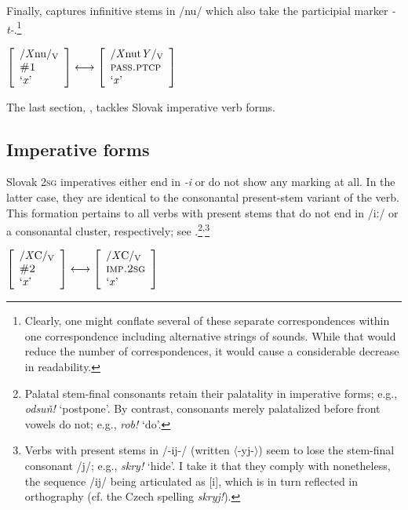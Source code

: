 \documentclass[output=paper,colorlinks,citecolor=brown]{langscibook}
\begin{document}
\noindent Finally,  captures infinitive stems in /nu/ which also take the participial mark\-er \textit{-t-}.\footnote{Clearly, one might conflate several of these separate correspondences within one correspondence including alternative strings of sounds. While that would reduce the number of correspondences, it would cause a considerable decrease in readability.}

\ea\label{ex:rulePASS_t_2}
$\left[
\begin{array}{l}
    \text{/\textit{X}nu/\textsubscript{V}} \\
    \textsc{\#1} \\
    \text{`\textit{x}'}
\end{array}
\right] 
\longleftrightarrow
\left[
\begin{array}{l}
    \text{/\textit{X}nut\textit{Y}/\textsubscript{V}} \\
    \textsc{pass.ptcp} \\
    \text{`\textit{x}'}
\end{array}
\right] $
\z

\noindent The last section, , tackles Slovak imperative verb forms.


\subsection{Imperative forms}\label{sec:IMP}

Slovak \textsc{2sg} imperatives either end in \textit{-i} or do not show any marking at all. In the latter case, they are identical to the consonantal present-stem variant of the verb. This formation pertains to all verbs with present stems that do not end in /iː/ or a consonantal cluster, respectively; see .\footnote{Palatal stem-final consonants retain their palatality in imperative forms; e.g., \textit{odsuň!} `postpone'. By contrast, consonants merely palatalized before front vowels do not; e.g., \textit{rob!} `do'.}\textsuperscript{,}\footnote{Verbs with present stems in /-ij-/ (written $\langle$-yj-$\rangle$) seem to lose the stem-final consonant /j/; e.g., \textit{skry!} `hide'. I take it that they comply with  nonetheless, the sequence /ij/ being articulated as [i], which is in turn reflected in orthography (cf. the Czech spelling \textit{skryj!}).}

\ea\label{ex:ruleIMP_1}
$\left[
\begin{array}{l}
    \text{/\textit{X}C/\textsubscript{V}} \\
    \textsc{\#2} \\
    \text{`\textit{x}'}
\end{array}
\right] 
\longleftrightarrow
\left[
\begin{array}{l}
    \text{/\textit{X}C/\textsubscript{V}} \\
    \textsc{imp.2sg} \\
    \text{`\textit{x}'}
\end{array}
\right] $
\z
\end{document}
